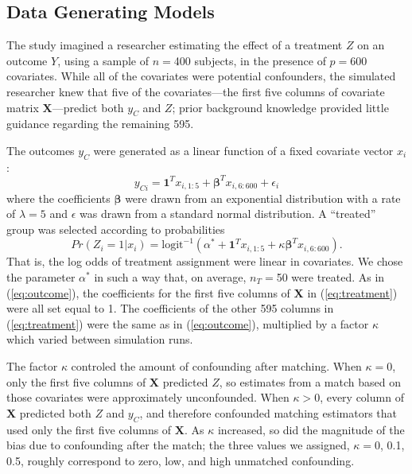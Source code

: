 \documentclass[12pt]{article}\usepackage[]{graphicx}\usepackage[]{color}
\newcommand{\covMat}{\bm{X}}
\newcommand{\covVec}{x}
\begin{document}
\subsection{Data Generating Models}\label{sec:sim-data-generating}
The study imagined a researcher estimating the effect of a treatment
$Z$ on an outcome $Y$, using a sample of $n=$400 subjects, in
the presence of $p=$600 covariates.
While all of the covariates were potential confounders, the simulated researcher knew that five of the covariates---the first
five columns of covariate matrix $\covMat$---predict both $y_C$ and
$Z$; prior background knowledge provided little guidance regarding the
remaining 595.

The outcomes $y_C$ were generated as a linear function of a
fixed covariate vector $\covVec_i$:
\begin{equation}\label{eq:outcome}
y_{Ci}=\bm{1 }^T x_{i, 1:5}+\bm{\beta }^T x_{i,6:600}+\epsilon_i
\end{equation}
where the coefficients $\bm{\beta}$ were drawn from an exponential
distribution with a rate of $\lambda=5$ and $\epsilon$ was drawn from a standard normal distribution.
 A ``treated'' group was selected
 according to probabilities
\begin{equation}\label{eq:treatment}
Pr(Z_i=1|\covVec_i)=\mathrm{logit}^{-1}(\alpha^*+\bm{1 }^Tx_{i,
  1:5}+\kappa\bm{\beta }^Tx_{i,6:600}).
\end{equation}
That is, the log odds of treatment assignment were linear in covariates.
We chose the parameter $\alpha^*$ in such a way that, on average,
$n_T=$50 were treated.
As in (\ref{eq:outcome}), the coefficients for the first five columns of $\covMat$ in (\ref{eq:treatment}) were all set equal to 1.
The coefficients of the other 595 columns in  (\ref{eq:treatment}) were the same as in (\ref{eq:outcome}), multiplied by a factor $\kappa$ which varied between simulation runs.

The factor $\kappa$ controled the amount of confounding after matching.
When $\kappa=0$, only the first five columns of $\covMat$ predicted $Z$,
so estimates from a match based on those covariates were approximately unconfounded.
When $\kappa>0$, every column of $\covMat$ predicted both $Z$ and $y_C$, and therefore confounded matching estimators that used only the first five columns of $\covMat$.
As $\kappa$ increased, so did the magnitude of the bias due to
confounding after the match; the three values we assigned,
$\kappa=$0, 0.1, 0.5, roughly correspond
to zero, low, and high unmatched confounding.
\end{document}
